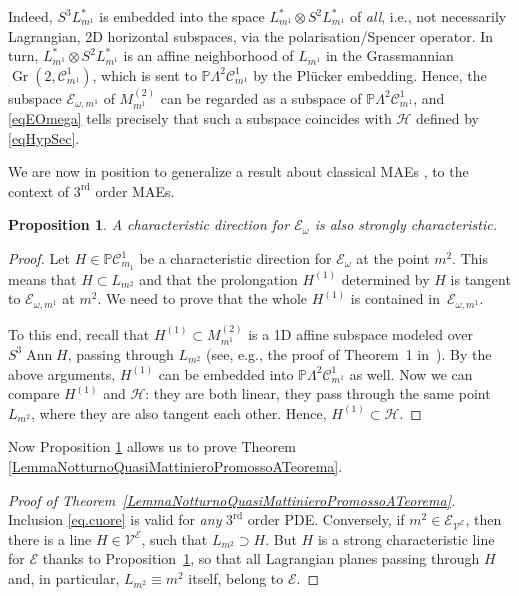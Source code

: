 \documentclass[10pt,a4paper]{amsart}
\newcommand{\C}{\mathcal{C}}
\newcommand{\M}{\mathcal{V}}
\newcommand{\E}{\mathcal{E}}
\newcommand{\Ann}{\operatorname{Ann}}
\newcommand{\Gr}{\operatorname{Gr}}
\renewcommand{\P}{\mathbb{P}}
\newcommand{\Rd}{^\textrm{rd}}
\newcommand{\elle}{H}
\numberwithin{equation}{section}
\newtheorem{Proposition}[Theorem]{Proposition}
 { \theoremstyle{definition}
\newtheorem{Definition}[Theorem]{Definition}
\newtheorem{Example}[Theorem]{Example}
\newtheorem{Remark}[Theorem]{Remark} }
\begin{document}
Indeed, $S^3L_{m^1}^\ast$ is embedded into the space $L_{m^1}^\ast\otimes S^2L_{m^1}^\ast$
 of \emph{all}, i.e., not necessarily Lagrangian, 2D horizontal subspaces, via the polarisation/Spencer operator. In turn, $L_{m^1}^\ast\otimes S^2L_{m^1}^\ast$ is an af\/f\/ine neighborhood of $L_{m^1}$ in the Grassmannian $\Gr(2,\C^1_{m^1})$, which is sent to $\P \Lambda^2\C^{1}_{m^1}$ by the Pl\"ucker embedding. Hence, the subspace $\E_{\omega, m^1}$ of $M^{(2)}_{m^1}$ can be regarded as a subspace of $\P \Lambda^2\C^{1}_{m^1}$, and \eqref{eqEOmega} tells precisely that such a subspace coincides with $\mathcal{H}$ def\/ined by \eqref{eqHypSec}.

We are now in position to generalize a result about classical MAEs \cite[Theorem 3.7]{MR2985508}, to the context of $3\Rd$ order MAEs.
\begin{Proposition}\label{proposizioneNotturna}
 A characteristic direction for $\E_\omega$ is also strongly characteristic.
\end{Proposition}
\begin{proof}
 Let $\elle\in\P\C^1_{m_1}$ be a characteristic direction for $\E_\omega$ at the point $m^2$. This means that $\elle\subset L_{m^2}$ and that the prolongation $\elle^{(1)}$ determined by $\elle$ is tangent to $\E_{\omega, m^1}$ at $m^2$. We need to prove that the whole $\elle^{(1)}$ is contained in~$\E_{\omega, m^1}$.

 To this end, recall that $\elle^{(1)}\subset M^{(2)}_{m^1}$ is a 1D af\/f\/ine subspace modeled over $S^3\Ann\elle$, passing through $L_{m^2}$ (see, e.g., the proof of Theorem~1 in~\cite{MorBach}). By the above arguments, $\elle^{(1)}$ can be embedded into $\P \Lambda^2\C^{1}_{m^1}$ as well. Now we can compare $\elle^{(1)}$ and $\mathcal{H}$: they are both linear, they pass through the same point~$L_{m^2}$, where they are also tangent each other. Hence, $\elle^{(1)}\subset \mathcal{H}$.
\end{proof}

Now Proposition \ref{proposizioneNotturna} allows us to prove Theorem \ref{LemmaNotturnoQuasiMattinieroPromossoATeorema}.


\begin{proof}[Proof of Theorem~\ref{LemmaNotturnoQuasiMattinieroPromossoATeorema}]
Inclusion \eqref{eq.cuore} is valid for \emph{any} $3\Rd$ order PDE. Conversely, if $m^2\in\E_{\M^\E}$, then there is a line $\elle\in \M^\E$, such that $L_{m^2}\supset\elle$. But
$\elle$ is a strong characteristic line for $\E$ thanks to
Proposition~\ref{proposizioneNotturna}, so that all Lagrangian planes passing through $\elle$ and, in particular, $L_{m^2}\equiv m^2$ itself, belong to $\E$.\end{proof}
\end{document}
